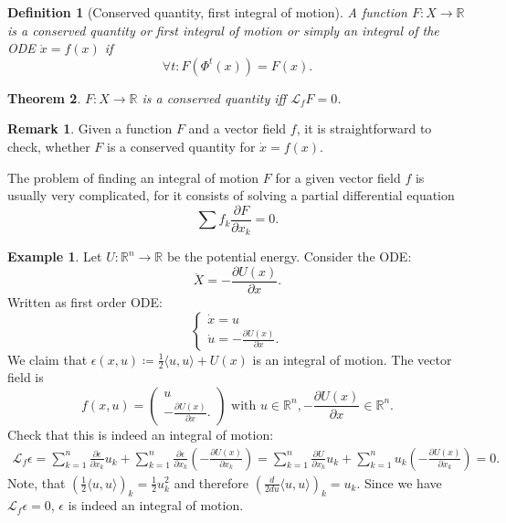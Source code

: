 \documentclass[hidelinks,a4paper, 11pt]{article}
\theoremstyle{plain}
\newtheorem{theorem}{Theorem}
\theoremstyle{break}
\theoremstyle{plain}
\newtheorem{definition}[theorem]{Definition}
\theoremstyle{definition}
\newtheorem*{example}{Example}
\newtheorem*{remark}{Remark}
\begin{document}
\begin{definition}[Conserved quantity, first integral of motion]\label{chap3:conservedquantitydef}
	A function $F: X \to \mathbb R$ is a conserved quantity or first integral of motion or simply an integral of the ODE $\dot x = f(x)$ if 
	\[
		\forall t: F(\Phi^t(x))  = F(x).
	\]
\end{definition}

\begin{theorem}
	$F: X \to \mathbb R$ is a conserved quantity iff $\mathcal L_fF = 0$.
\end{theorem}

\begin{remark}
	Given a function $F$ and a vector field $f$, it is straightforward to check, whether $F$ is a conserved quantity for $\dot x = f(x)$.
	
	The problem of finding an integral of motion $F$ for a given vector field $f$ is usually very complicated, for it consists of    solving a partial differential equation 
	\[
		\sum f_k \frac{\partial F}{\partial x_k} = 0.
	\] 
\end{remark}

\begin{example}
	Let $U: \mathbb R^n \to \mathbb R$ be the potential energy. Consider the ODE:
	\[
		\ddot X  = - \frac{\partial U(x)}{\partial x}.
	\]
	Written as first order ODE:
	\[
		\begin{cases}
			\dot x = u \\
			\dot u = - \frac{\partial U(x)}{\partial x}.
		\end{cases}
	\]
	We claim that $\epsilon(x,u) \coloneqq \frac{1}{2}\langle u,u \rangle + U(x)$ is an integral of motion. The vector field is
	\[
		f(x,u) = \begin{pmatrix}
			u \\ - \frac{\partial U(x)}{\partial x}.
		\end{pmatrix} \text{ with } u \in \mathbb R^n, - \frac{\partial U(x)}{\partial x} \in \mathbb R^n.
	\]
	Check that this is indeed an integral of motion:
	\begin{align*}
		\mathcal L_f \epsilon = \sum^n_{k=1} \frac{\partial \epsilon}{\partial x_k}u_k + \sum^n_{k=1} \frac{\partial \epsilon}{\partial x_k}\left(-\frac{\partial U(x)}{\partial x_k}\right) =  \sum^n_{k=1} \frac{\partial U}{\partial x_k}u_k + \sum^n_{k=1} u_k\left(-\frac{\partial U(x)}{\partial x_k}\right) = 0.
	\end{align*}
	Note, that $(\frac{1}{2}\langle u,u \rangle)_k = \frac{1}{2}u_k^2$ and therefore $(\frac{d}{2du}\langle u,u \rangle)_k = u_k$. Since we have $\mathcal L_f \epsilon = 0$, $\epsilon$ is indeed an integral of motion.
\end{example}
\end{document}
